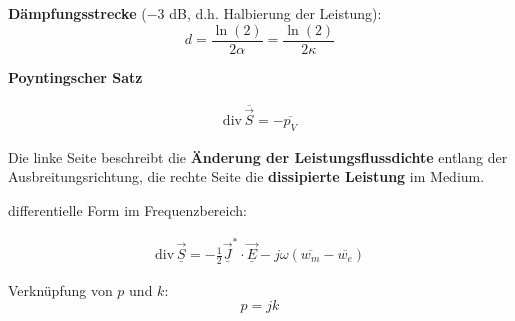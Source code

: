 \textbf{Dämpfungsstrecke} ($-3$ dB, d.h. Halbierung der Leistung):
\begin{equation}
d = \frac{\ln(2)}{2\alpha} = \frac{\ln(2)}{2\kappa}
\end{equation}






\textbf{Poyntingscher Satz}

\begin{align}
\text{div}\,\overline{\vec{S}} = -\overline{p_V}
\end{align}


Die linke Seite beschreibt die \textbf{Änderung der Leistungsflussdichte} entlang der Ausbreitungsrichtung, die rechte Seite die \textbf{dissipierte Leistung} im Medium.

differentielle Form im Frequenzbereich:

\begin{align}
\text{div}\,\underline{\vec{S}} = -\frac{1}{2}\underline{\vec{J}}^* \cdot \underline{\vec{E}} - j\omega\left(\overline{w_m} - \overline{w_e}\right)
\end{align}





Verknüpfung von $p$ und $k$:
\begin{equation}
p = jk
\end{equation}

